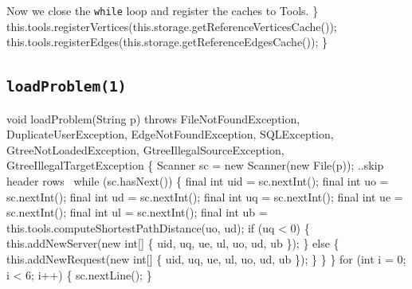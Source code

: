 {\small Now we close the {\tt{}while} loop and register the caches to Tools.}
\nwenddocs{}\plusendmoddef
  \}
  this.tools.registerVertices(this.storage.getReferenceVerticesCache());
  this.tools.registerEdges(this.storage.getReferenceEdgesCache());
\}
\nwendcode{}\nwdocspar

\subsection{{\tt{}\protect{}loadProblem(1)}}
\nwenddocs{}\endmoddef{}
void loadProblem(String p)
throws FileNotFoundException, DuplicateUserException, EdgeNotFoundException, SQLException,
       GtreeNotLoadedException, GtreeIllegalSourceException, GtreeIllegalTargetException \{
  Scanner sc = new Scanner(new File(p));
  \LA{}..skip header rows~{\nwtagstyle{}}\RA{}
  while (sc.hasNext()) \{
    final int uid = sc.nextInt();
    final int  uo = sc.nextInt();
    final int  ud = sc.nextInt();
    final int  uq = sc.nextInt();
    final int  ue = sc.nextInt();
    final int  ul = sc.nextInt();
    final int  ub = this.tools.computeShortestPathDistance(uo, ud);
    if (uq < 0) \{
      this.addNewServer(new int[] \{ uid, uq, ue, ul, uo, ud, ub \});
    \} else \{
      this.addNewRequest(new int[] \{ uid, uq, ue, ul, uo, ud, ub \});
    \}
  \}
\}
\eatline
{}\nwendcode{}\endmoddef{}
for (int i = 0; i < 6; i++) \{
  sc.nextLine();
\}
\nwendcode{}\nwdocspar

